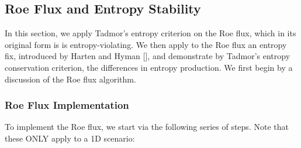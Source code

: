 \documentclass[a4paper]{article}
\numberwithin{equation}{section}
\begin{document}
\subsection{Roe Flux and Entropy Stability}
In this section, we apply Tadmor's entropy criterion on the Roe flux, which in its original form is is entropy-violating. We then apply to the Roe flux an entropy fix, introduced by Harten and Hyman [], and demonstrate by Tadmor's entropy conservation criterion, the differences in entropy production. We first begin by a discussion of the Roe flux algorithm.

\subsubsection{Roe Flux Implementation} \label{sec:RoeFluxAlgorithm}
To implement the Roe flux, we start via the following series of steps. Note that these ONLY apply to a 1D scenario:
\end{document}
